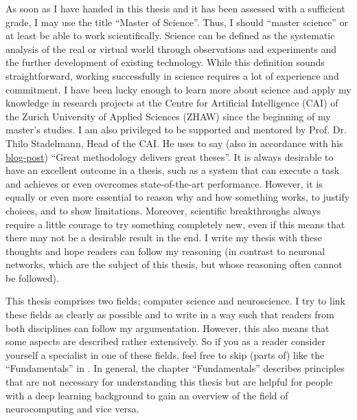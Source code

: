 \small
As soon as I have handed in this thesis and it has been assessed with a sufficient grade, I may use the title ``Master of Science''.
Thus, I should ``master science'' or at least be able to work scientifically.
Science can be defined as the systematic analysis of the real or virtual world through observations and experiments and the further development of existing technology.
While this definition sounds straightforward, working successfully in science requires a lot of experience and commitment.
I have been lucky enough to learn more about science and apply my knowledge in research projects at the Centre for Artificial Intelligence (CAI) of the Zurich University of Applied Sciences (ZHAW) since the beginning of my master's studies.
I am also privileged to be supported and mentored by Prof. Dr. Thilo Stadelmann, Head of the CAI.
He uses to say (also in accordance with his \href{https://stdm.github.io/Great-methodology-delivers-great-theses/}{blog-post}) ``Great methodology delivers great theses''.
It is always desirable to have an excellent outcome in a thesis, such as a system that can execute a task and achieves or even overcomes state-of-the-art performance.
However, it is equally or even more essential to reason why and how something works, to justify choices, and to show limitations.
Moreover, scientific breakthroughs always require a little courage to try something completely new, even if this means that there may not be a desirable result in the end.
I write my thesis with these thoughts and hope readers can follow my reasoning (in contrast to neuronal networks, which are the subject of this thesis, but whose reasoning often cannot be followed).

This thesis comprises two fields; computer science and neuroscience.
I try to link these fields as clearly as possible and to write in a way such that readers from both disciplines can follow my argumentation.
However, this also means that some aspects are described rather extensively.
So if you as a reader consider yourself a specialist in one of these fields, feel free to skip (parts of) like the ``Fundamentals'' in .
In general, the chapter ``Fundamentals'' describes principles that are not necessary for understanding this thesis but are helpful for people with a deep learning background to gain an overview of the field of neurocomputing and vice versa.

